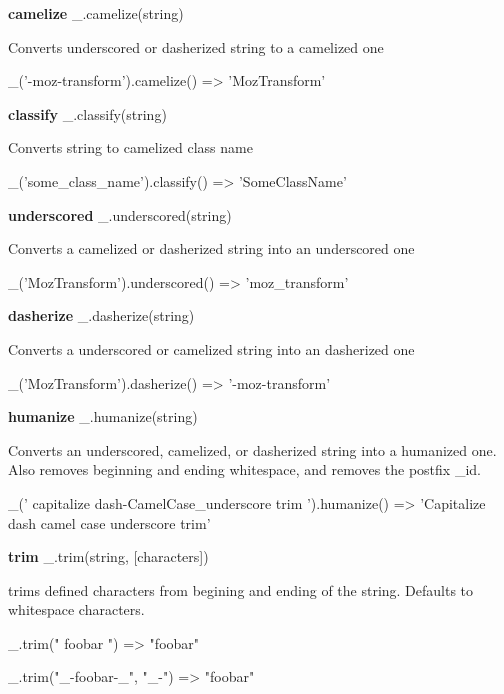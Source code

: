 {\bfseries camelize} \+\_\+.\+camelize(string)

Converts underscored or dasherized string to a camelized one


\begin{DoxyCode}
\_('-moz-transform').camelize()
=> 'MozTransform'
\end{DoxyCode}


{\bfseries classify} \+\_\+.\+classify(string)

Converts string to camelized class name


\begin{DoxyCode}
\_('some\_class\_name').classify()
=> 'SomeClassName'
\end{DoxyCode}


{\bfseries underscored} \+\_\+.\+underscored(string)

Converts a camelized or dasherized string into an underscored one


\begin{DoxyCode}
\_('MozTransform').underscored()
=> 'moz\_transform'
\end{DoxyCode}


{\bfseries dasherize} \+\_\+.\+dasherize(string)

Converts a underscored or camelized string into an dasherized one


\begin{DoxyCode}
\_('MozTransform').dasherize()
=> '-moz-transform'
\end{DoxyCode}


{\bfseries humanize} \+\_\+.\+humanize(string)

Converts an underscored, camelized, or dasherized string into a humanized one. Also removes beginning and ending whitespace, and removes the postfix \textquotesingle{}\+\_\+id\textquotesingle{}.


\begin{DoxyCode}
\_('  capitalize dash-CamelCase\_underscore trim  ').humanize()
=> 'Capitalize dash camel case underscore trim'
\end{DoxyCode}


{\bfseries trim} \+\_\+.\+trim(string, \mbox{[}characters\mbox{]})

trims defined characters from begining and ending of the string. Defaults to whitespace characters.


\begin{DoxyCode}
\_.trim("  foobar   ")
=> "foobar"

\_.trim("\_-foobar-\_", "\_-")
=> "foobar"
\end{DoxyCode}


